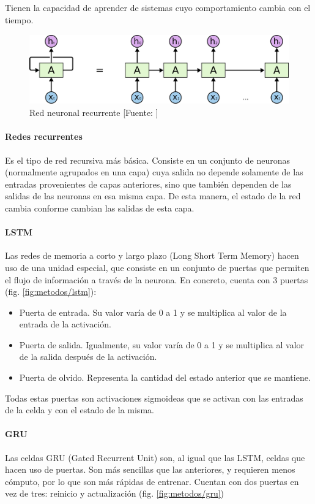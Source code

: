 Tienen la capacidad de aprender de sistemas cuyo comportamiento cambia con el tiempo.
\begin{figure}
	\centering
	\includegraphics[height=3cm]{imagenes/metodos/rnn.png}
	\caption{Red neuronal recurrente [Fuente: \cite{colah}]}
	\label{fig:metodos/rnn}
\end{figure}
\paragraph{Redes recurrentes}
Es el tipo de red recursiva más básica. Consiste en un conjunto de neuronas (normalmente agrupados en una capa) cuya salida no depende solamente de las entradas provenientes de capas anteriores, sino que también dependen de las salidas de las neuronas en esa misma capa. De esta manera, el estado de la red cambia conforme cambian las salidas de esta capa.
\paragraph{LSTM}
Las redes de memoria a corto y largo plazo (Long Short Term Memory) \cite{hochreiter1997long}\cite{colah} hacen uso de una unidad especial, que consiste en un conjunto de puertas que permiten el flujo de información a través de la neurona. En concreto, cuenta con 3 puertas (fig. \ref{fig:metodos/lstm}):

\begin{itemize}
	\item Puerta de entrada. Su valor varía de 0 a 1 y se multiplica al valor de la entrada de la activación.
	\item Puerta de salida. Igualmente, su valor varía de 0 a 1 y se multiplica al valor de la salida después de la activación.
	\item Puerta de olvido. Representa la cantidad del estado anterior que se mantiene.
\end{itemize}

Todas estas puertas son activaciones sigmoideas que se activan con las entradas de la celda y con el estado de la misma.
\paragraph{GRU}
Las celdas GRU (Gated Recurrent Unit) \cite{chung2014empirical} son, al igual que las LSTM, celdas que hacen uso de puertas. Son más sencillas que las anteriores, y requieren menos cómputo, por lo que son más rápidas de entrenar. Cuentan con dos puertas en vez de tres: reinicio y actualización (fig. \ref{fig:metodos/gru})

